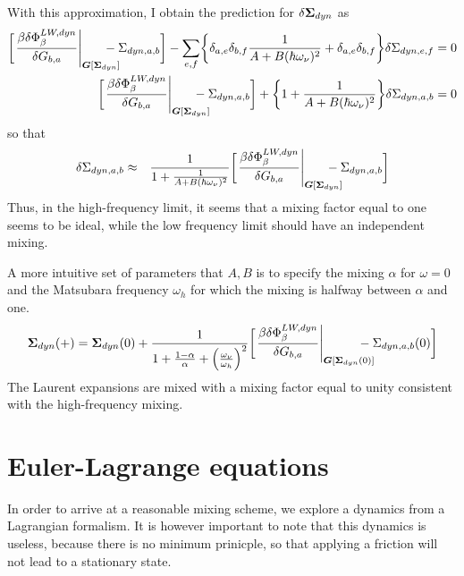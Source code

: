 \documentclass[11pt,a4paper]{report}
\begin{document}
With this approximation, I obtain the prediction for
$\delta\bm{\Sigma}_{dyn}$ as
\begin{eqnarray}
\biggl[\left.\frac{\beta\delta\Phi^{LW,dyn}_\beta}{\delta G_{b,a}}
\right|_{\mat{G}[\mat{\Sigma}_{dyn}]}\hspace{-0.5cm}
-\Sigma_{dyn,a,b}
\biggr]
-
\sum_{e,f}
\biggl\lbrace
\delta_{a,e}\delta_{b,f}
\frac{1}{A+B(\hbar\omega_\nu)^2}
+\delta_{a,e}\delta_{b,f}
\biggr\rbrace
\delta\Sigma_{dyn,e,f}
=0
\nonumber\\
\biggl[\left.\frac{\beta\delta\Phi^{LW,dyn}_\beta}{\delta G_{b,a}}
\right|_{\mat{G}[\mat{\Sigma}_{dyn}]}\hspace{-0.5cm}
-\Sigma_{dyn,a,b}
\biggr]
+
\biggl\lbrace
1+\frac{1}{A+B(\hbar\omega_\nu)^2}
\biggr\rbrace
\delta\Sigma_{dyn,a,b}
=0
\end{eqnarray}
so that
\begin{eqnarray}
\delta\Sigma_{dyn,a,b}
&\approx&\frac{1}{1+\frac{1}{A+B(\hbar\omega_\nu)^2}}
\biggl[\left.\frac{\beta\delta\Phi^{LW,dyn}_\beta}{\delta G_{b,a}}
\right|_{\mat{G}[\mat{\Sigma}_{dyn}]}\hspace{-0.5cm}
-\Sigma_{dyn,a,b}
\biggr]
\end{eqnarray}
Thus, in the high-frequency limit, it seems that a mixing factor equal
to one seems to be ideal, while the low frequency limit should have an
independent mixing. 

A more intuitive set of parameters that $A,B$ is to specify the mixing
$\alpha$ for $\omega=0$ and the Matsubara frequency $\omega_h$ for
which the mixing is halfway between $\alpha$ and one.
\begin{eqnarray}
\mat{\Sigma}_{dyn}(+)=\mat{\Sigma}_{dyn}(0)
+\frac{1}{1+\frac{1-\alpha}{\alpha}+\left(\frac{\omega_\nu}{\omega_h}\right)^2}
\biggl[\left.\frac{\beta\delta\Phi^{LW,dyn}_\beta}{\delta G_{b,a}}
\right|_{\mat{G}[\mat{\Sigma}_{dyn}(0)]}\hspace{-0.5cm}
-\Sigma_{dyn,a,b}(0)
\biggr]
\label{eq:mixingsigma}
\end{eqnarray}
The Laurent expansions are mixed with a mixing factor equal to unity
consistent with the high-frequency mixing.


\section{Euler-Lagrange equations}
In order to arrive at a reasonable mixing scheme, we explore a
dynamics from a Lagrangian formalism. It is however important to note
that this dynamics is useless, because there is no minimum prinicple,
so that applying a friction will not lead to a stationary state.
\end{document}
